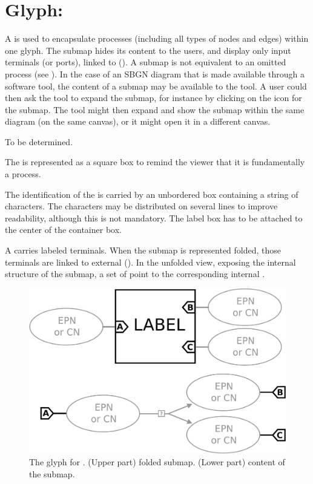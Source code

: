 
\section{Glyph: }
\label{sec:submap}

A  is used to encapsulate processes (including all types of nodes and edges) within one glyph.  The submap hides its content to the users, and display only input terminals (or ports), linked to  ().  A submap is not equivalent to an omitted process (see ).  In the case of an SBGN diagram that is made available through a software tool, the content of a submap may be available to the tool.  A user could then ask the tool to expand the submap, for instance by clicking on the icon for the submap.  The tool might then expand and show the submap within the same diagram (on the same canvas), or it might open it in a different canvas.

\begin{glyphDescription}

\glyphSboTerm To be determined.

\glyphContainer The  is represented as a square box to remind the viewer that it is fundamentally a process.

\glyphLabel The identification of the  is carried by an unbordered box containing a string of characters.  The characters may be distributed on several lines to improve readability, although this is not mandatory.  The label box has to be attached to the center of the container box.

\glyphAux A  carries labeled terminals.  When the submap is represented folded, those terminals are linked to external  ().  In the unfolded view, exposing the internal structure of the submap, a set of  point to the corresponding internal  .

\end{glyphDescription}


\begin{figure}[H]
  \centering
  \includegraphics[scale = 0.22]{images/submap}
  \caption{The \PD glyph for . (Upper part) folded submap. (Lower part) content of the submap.}
  \label{fig:submap}
\end{figure}

